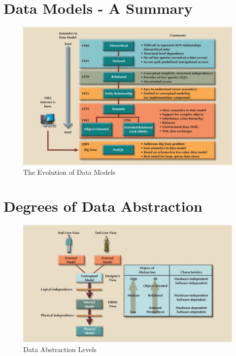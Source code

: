 \documentclass[a4paper, 12pt, titlepage]{report}
\begin{document}
\section{Data Models - A Summary}
\begin{figure}[H]
\centering
\includegraphics[scale=0.5]{DMSummary}
\caption{The Evolution of Data Models}
\end{figure}
\section{Degrees of Data Abstraction}
\begin{figure}[H]
\centering
\includegraphics[scale=0.45]{DLAbs}
\caption{Data Abstraction Levels}
\end{figure}
\end{document}
